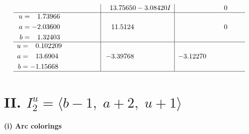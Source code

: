 \documentclass[1p]{elsarticle_modified}
\theoremstyle{definition}
\begin{document}
$$\begin{array}{c|c|c}
 & \phantom{-}13.75650 - 3.08420 I & \phantom{-0.000000 } 0 \\ \hline\begin{aligned}
u &= \phantom{-}1.73966\phantom{ +0.000000I} \\
a &= -2.03600\phantom{ +0.000000I} \\
b &= \phantom{-}1.32403\phantom{ +0.000000I}\end{aligned}
 & \phantom{-}11.5124\phantom{ +0.000000I} & \phantom{-0.000000 } 0 \\ \hline\begin{aligned}
u &= \phantom{-}0.102209\phantom{ +0.000000I} \\
a &= \phantom{-}13.6904\phantom{ +0.000000I} \\
b &= -1.15668\phantom{ +0.000000I}\end{aligned}
 & -3.39768\phantom{ +0.000000I} & -3.12270\phantom{ +0.000000I}\\
 \hline 
 \end{array}$$\newpage\newpage\renewcommand{\arraystretch}{1}
\centering \section*{II. $I^u_{2}= \langle b-1,\;a+2,\;u+1 \rangle$}
\flushleft \textbf{(i) Arc colorings}\\
\end{document}

